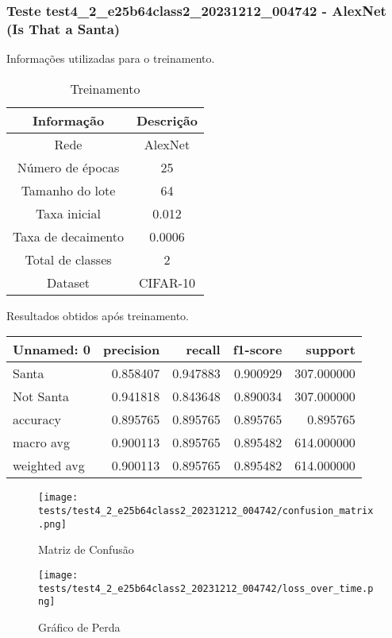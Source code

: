 \subsubsection{Teste test4_2_e25b64class2_20231212_004742 - AlexNet (Is That a Santa)}

Informações utilizadas para o treinamento.

\begin{table}[ht]
   \centering
   \caption{Treinamento}
   \label{tab:modelos}
   \begin{tabular}{| c | c | }
      \hline 
      \textbf{Informação} & \textbf{Descrição} \\
      \hline \hline 
      Rede & AlexNet \\
      \hline
      Número de épocas & 25\\
      \hline
      Tamanho do lote & 64\\
      \hline
      Taxa inicial & 0.012 \\
      \hline
      Taxa de decaimento & 0.0006 \\
      \hline
      Total de classes & 2\\
      \hline
      Dataset & CIFAR-10\\
      \hline
   \end{tabular} 
\end{table}

Resultados obtidos após treinamento.

\begin{tabular}{lrrrr}
\toprule
  Unnamed: 0 &  precision &   recall &  f1-score &    support \\
\midrule
       Santa &   0.858407 & 0.947883 &  0.900929 & 307.000000 \\
   Not Santa &   0.941818 & 0.843648 &  0.890034 & 307.000000 \\
    accuracy &   0.895765 & 0.895765 &  0.895765 &   0.895765 \\
   macro avg &   0.900113 & 0.895765 &  0.895482 & 614.000000 \\
weighted avg &   0.900113 & 0.895765 &  0.895482 & 614.000000 \\
\bottomrule
\end{tabular}


\begin{figure}[ht]
 \begin{center}
   \texttt{[image: tests/test4\_2\_e25b64class2\_20231212\_004742/confusion\_matrix.png]}
  \caption{Matriz de Confusão}
  \label{fig:fig03}
 \end{center}
\end{figure}

\begin{figure}[ht]
 \begin{center}
   \texttt{[image: tests/test4\_2\_e25b64class2\_20231212\_004742/loss\_over\_time.png]}
  \caption{Gráfico de Perda}
  \label{fig:fig04}
 \end{center}
\end{figure}
